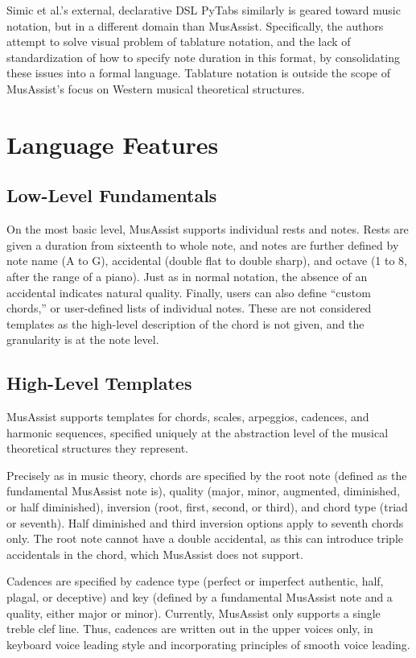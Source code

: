 \documentclass{article}
\begin{document}
Simic et al.'s external, declarative DSL PyTabs similarly is geared toward music notation, but in a different
domain than MusAssist. Specifically, 
the authors attempt to solve visual problem of  tablature  notation, 
and the lack of standardization of how  to specify note duration in this format, by consolidating 
these issues into a formal language. Tablature notation is outside the scope of MusAssist's focus on Western 
musical theoretical structures.

\section{Language Features}\label{sec:language_features}
\subsection{Low-Level Fundamentals}
On the most basic level, MusAssist supports individual rests and notes. Rests are  
given a duration from sixteenth to whole note, and notes are further defined by note name (A to G), 
accidental (double flat to double sharp), and octave (1 to 8, after the range of a piano).
Just as in normal notation, the absence of an accidental indicates natural quality.
Finally, users can also define ``custom chords,'' or user-defined lists of individual notes.
These are not considered templates as the high-level description of the chord is not given, and the
granularity is at the note level.

\subsection{High-Level Templates}
MusAssist supports templates for chords, scales, arpeggios, cadences, and harmonic sequences, specified uniquely
at the abstraction level of the musical theoretical structures they represent. 

Precisely as in music theory, chords are specified by the 
root note (defined as the fundamental MusAssist note is),
quality (major, minor, augmented, diminished, or half diminished), 
inversion (root, first, second, or third), and 
chord type (triad or seventh). 
Half diminished and third inversion options apply to seventh chords only. The root note 
cannot have a double accidental, as this can introduce triple accidentals in the chord, which MusAssist
does not support.

Cadences are specified by cadence type (perfect or imperfect authentic, half, plagal, 
or deceptive) and key (defined by a fundamental MusAssist note and a quality, either major or minor). 
Currently, MusAssist only supports a single treble clef line. Thus, cadences are written out in the 
upper voices only, in keyboard voice leading style and incorporating principles of smooth voice leading.
\end{document}
